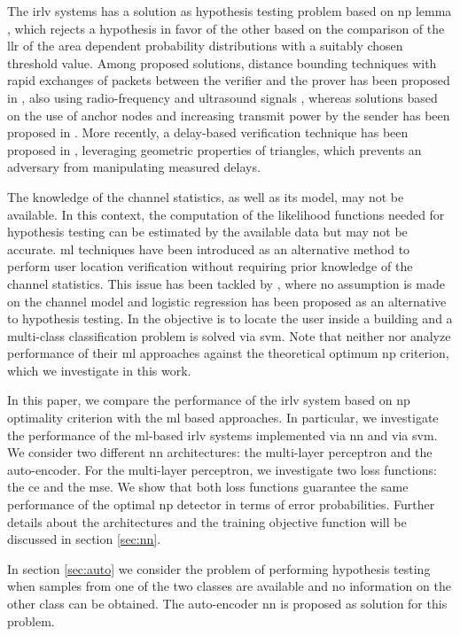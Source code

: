 \documentclass[draftcls,onecolumn,12pt]{IEEEtran}
\begin{document}
The \ac{irlv} systems has a solution as hypothesis testing problem based on \ac{np} lemma \cite{Neyman289}, which rejects a hypothesis in favor of the other based on the comparison of the \ac{llr} of the area dependent probability distributions with a suitably chosen threshold value. Among proposed solutions, distance bounding techniques with rapid exchanges of packets between the verifier and the prover has been proposed in \cite{Brands}, also using radio-frequency and ultrasound signals \cite{Sastry}, whereas solutions based on the use of anchor nodes and increasing transmit power by the sender has been proposed in \cite{Vora}. More recently, a delay-based verification technique has been proposed  in \cite{7145434}, leveraging geometric properties of triangles, which prevents an adversary from manipulating measured delays.  

The knowledge of the channel statistics, as well as its model, may not be available. In this context, the computation of the likelihood functions needed for hypothesis testing can be estimated by the available data but may not be accurate. \ac{ml} techniques have been introduced as an alternative method to perform user location verification without requiring prior knowledge of the channel statistics. This issue has been tackled by \cite{xiao-2018}, where no assumption is made on the channel model and logistic regression has been proposed as an alternative to hypothesis testing. In \cite{tian2015robust} the objective is to locate the user inside a building and a multi-class classification problem is solved via \ac{svm}. Note that neither  \cite{xiao-2018}  nor \cite{tian2015robust} analyze performance of their \ac{ml} approaches against the theoretical optimum \ac{np} criterion, which we investigate in this work.

In this paper, we compare the performance of the \ac{irlv} system based on \ac{np} optimality criterion with the \ac{ml} based approaches. In particular, we investigate the performance of the \ac{ml}-based \ac{irlv} systems implemented via \ac{nn} and via \ac{svm}. We consider two different \ac{nn} architectures: the multi-layer perceptron and the auto-encoder. For the multi-layer perceptron, we investigate two loss functions: the \ac{ce} and the \ac{mse}. We show that both loss functions guarantee the same performance of the optimal \ac{np} detector in terms of error probabilities. Further details about the architectures and the training objective function will be discussed in section \ref{sec:nn}.

In section \ref{sec:auto} we consider the problem of performing hypothesis testing when samples from one of the two classes are available and no information on the other class can be obtained. The auto-encoder \ac{nn} is proposed as solution for this problem.
\end{document}
